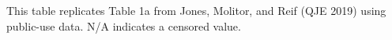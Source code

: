 \documentclass{article}
\begin{document}
\begin{landscape}
\begin{table}[tbp]
{\begin{tabularx}{\linewidth}{lCCCCC}
\end{tabularx}
\begin{flushleft}
\scriptsize This table replicates Table 1a from Jones, Molitor, and Reif (QJE 2019) using public-use data. N/A indicates a censored value.
\end{flushleft}
}
\end{table}
\restoregeometry
\end{landscape}
\end{document}
